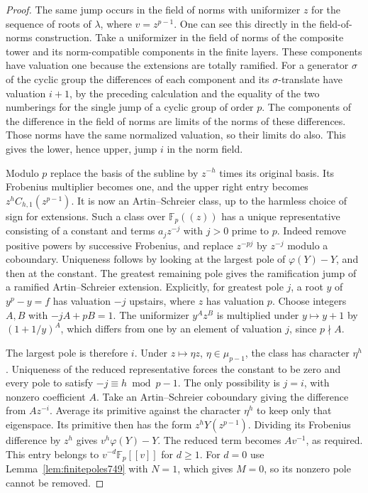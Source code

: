 \documentclass[a4paper,11pt]{article}
\theoremstyle{definition}
\theoremstyle{remark}
\numberwithin{equation}{section}
\begin{document}
\begin{proof}
The same jump occurs in the field of norms with uniformizer \(z\)
for the sequence of roots of \(\lambda\), where \(v=z^{p-1}\).
One can see this directly in the field-of-norms construction.
Take a uniformizer in the field of norms of the composite tower
and its norm-compatible components in the finite layers. These
components have valuation one because the extensions are totally
ramified. For a generator \(\sigma\) of the cyclic group the
differences of each component and its \(\sigma\)-translate have
valuation \(i+1\), by the preceding calculation and the equality
of the two numberings for the single jump of a cyclic group
of order \(p\). The components of the difference in the field
of norms are limits of the norms of these differences. Those
norms have the same normalized valuation, so their limits do also.
This gives the lower, hence upper, jump \(i\) in the norm field.
~\cite{III-II-wintenberger749}

Modulo \(p\) replace the basis of the subline by \(z^{-h}\)
times its original basis. Its Frobenius multiplier becomes one,
and the upper right entry becomes \(z^h C_{h,1}(z^{p-1})\).
It is now an Artin--Schreier class, up to the harmless choice
of sign for extensions. Such a class over \(\mathbb F_p((z))\)
has a unique representative consisting of a constant and terms
\(a_j z^{-j}\) with \(j>0\) prime to \(p\). Indeed remove
positive powers by successive Frobenius, and replace \(z^{-pj}\)
by \(z^{-j}\) modulo a coboundary. Uniqueness follows by looking
at the largest pole of \(\varphi(Y)-Y\), and then at the constant.
The greatest remaining pole gives the ramification jump of a
ramified Artin--Schreier extension. Explicitly, for greatest pole
\(j\), a root \(y\) of \(y^p-y=f\) has valuation \(-j\) upstairs,
where \(z\) has valuation \(p\). Choose integers \(A,B\) with
\(-jA+pB=1\). The uniformizer \(y^Az^B\) is multiplied under
\(y\mapsto y+1\) by \((1+1/y)^A\), which differs from one by
an element of valuation \(j\), since \(p\nmid A\).

The largest pole is therefore \(i\). Under \(z\mapsto\eta z\),
\(\eta\in\mu_{p-1}\), the class has character \(\eta^h\).
Uniqueness of the reduced representative forces the constant
to be zero and every pole to satisfy \(-j\equiv h\bmod p-1\).
The only possibility is \(j=i\), with nonzero coefficient \(A\).
Take an Artin--Schreier coboundary giving the difference from
\(A z^{-i}\). Average its primitive against the character
\(\eta^h\) to keep only that eigenspace. Its primitive then
has the form \(z^hY(z^{p-1})\). Dividing its Frobenius
difference by \(z^h\) gives \(v^h\varphi(Y)-Y\). The reduced
term becomes \(A v^{-1}\), as required. This entry belongs to
\(v^{-d}\mathbb F_p[[v]]\) for \(d\ge1\). For \(d=0\) use
Lemma~\ref{lem:finitepoles749} with \(N=1\), which gives \(M=0\),
so its nonzero pole cannot be removed.
\end{proof}
\end{document}
